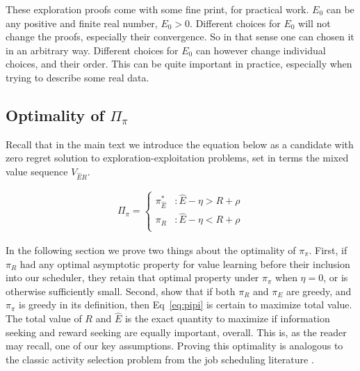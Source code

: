 These exploration proofs come with some fine print, for practical work. $E_0$ can be any positive and finite real number, $E_0 > 0$. Different choices for $E_0$ will not change the proofs, especially their convergence. So in that sense one can chosen it in an arbitrary way. Different choices for $E_0$ can however change individual choices, and their order. This can be quite important in practice, especially when trying to describe some real data.  

\subsection*{Optimality of $\Pi_{\pi}$} 
Recall that in the main text we introduce the equation below as a candidate with zero regret solution to exploration-exploitation problems, set in terms the mixed value sequence $V_{\hat{E}R}$.

\begin{equation} 
    \label{eq:pipi_app}
    \begin{split}
        \Pi_{\pi} = 
        \begin{cases}
            \pi^*_{\hat{E}} & : \hat{E} - \eta > R + \rho \\
            \pi_R 	& : \hat{E} - \eta < R + \rho \\
        \end{cases}
    \end{split}
\end{equation}

In the following section we prove two things about the optimality of $\pi_\pi$. First, if $\pi_R$ had any optimal asymptotic property for value learning before their inclusion into our scheduler, they retain that optimal property under $\pi_\pi$ when $\eta = 0$, or is otherwise sufficiently small. Second, show that if both $\pi_R$ and $\pi_E$ are greedy, and $\pi_\pi$ is greedy in its definition, then Eq~\ref{eq:pipi} is certain to maximize total value. The total value of $R$ and $\hat E$ is the exact quantity to maximize if information seeking and reward seeking are equally important, overall. This is, as the reader may recall, one of our key assumptions. Proving this optimality is analogous to the classic activity selection problem from the job scheduling literature \citep{BellmanBook,Roughgarden2019}.

